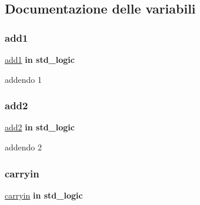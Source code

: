 \subsection{Documentazione delle variabili}
\mbox{\label{group___base_cell_ga2b16ee1ce0d8ffb8f85ccea13f8ba38d}} 
\subsubsection{\texorpdfstring{add1}{add1}}
{\footnotesize\ttfamily \hyperlink{group___base_cell_ga2b16ee1ce0d8ffb8f85ccea13f8ba38d}{add1} {\bfseries \textcolor{vhdlchar}{in}\textcolor{vhdlchar}{ }} {\bfseries \textcolor{vhdlchar}{std\+\_\+logic}\textcolor{vhdlchar}{ }} \hspace{0.3cm}{\ttfamily [Port]}}



addendo 1 

\mbox{\label{group___base_cell_gac3ebb689e34fc5e7657726b18d8b5369}} 
\subsubsection{\texorpdfstring{add2}{add2}}
{\footnotesize\ttfamily \hyperlink{group___base_cell_gac3ebb689e34fc5e7657726b18d8b5369}{add2} {\bfseries \textcolor{vhdlchar}{in}\textcolor{vhdlchar}{ }} {\bfseries \textcolor{vhdlchar}{std\+\_\+logic}\textcolor{vhdlchar}{ }} \hspace{0.3cm}{\ttfamily [Port]}}



addendo 2 

\mbox{\label{group___base_cell_gaa556a73dc4a4de1a0d662b25adbcbe33}} 
\subsubsection{\texorpdfstring{carryin}{carryin}}
{\footnotesize\ttfamily \hyperlink{group___base_cell_gaa556a73dc4a4de1a0d662b25adbcbe33}{carryin} {\bfseries \textcolor{vhdlchar}{in}\textcolor{vhdlchar}{ }} {\bfseries \textcolor{vhdlchar}{std\+\_\+logic}\textcolor{vhdlchar}{ }} \hspace{0.3cm}{\ttfamily [Port]}}



